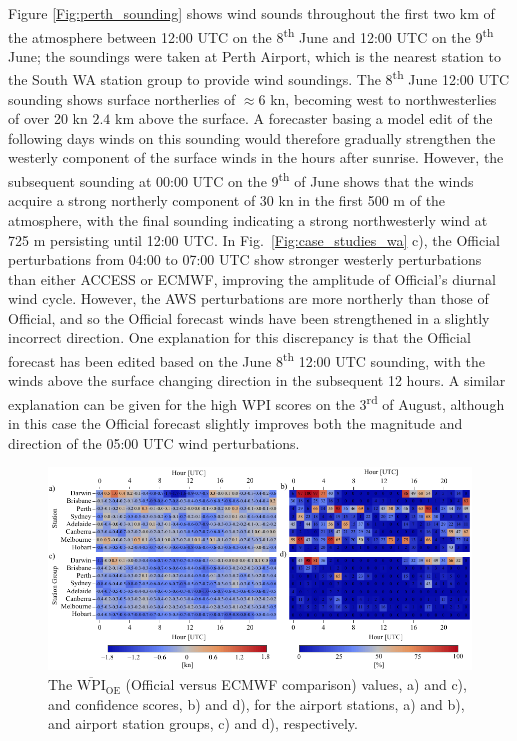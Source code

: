 \documentclass{ametsoc}
\begin{document}
Figure \ref{Fig:perth_sounding} shows wind sounds throughout the first two km of the atmosphere between 12:00 UTC on the 8\textsuperscript{th} June and 12:00 UTC on the 9\textsuperscript{th} June; the soundings were taken at Perth Airport, which is the nearest station to the South WA station group to provide wind soundings. The 8\textsuperscript{th} June 12:00 UTC sounding shows surface northerlies of $\approx 6$ kn, becoming west to northwesterlies of over 20 kn $2.4$ km above the surface. A forecaster basing a model edit of the following days winds on this sounding would therefore gradually strengthen the westerly component of the surface winds in the hours after sunrise. However, the subsequent sounding at 00:00 UTC on the 9\textsuperscript{th} of June shows that the winds acquire a strong northerly component of 30 kn in the first 500 m of the atmosphere, with the final sounding indicating a strong northwesterly wind at 725 m persisting until 12:00 UTC. In Fig.~\ref{Fig:case_studies_wa} c), the Official perturbations from 04:00 to 07:00 UTC show stronger westerly perturbations than either ACCESS or ECMWF, improving the amplitude of Official's diurnal wind cycle. However, the AWS perturbations are more northerly than those of Official, and so the Official forecast winds have been strengthened in a slightly incorrect direction. One explanation for this discrepancy is that the Official forecast has been edited based on the June 8\textsuperscript{th} 12:00 UTC sounding, with the winds above the surface changing direction in the subsequent 12 hours. A similar explanation can be given for the high WPI scores on the  3\textsuperscript{rd} of August, although in this case the Official forecast slightly improves both the magnitude and direction of the 05:00 UTC wind perturbations.

\begin{figure}
\centering
\includegraphics[width=39pc]{airport_wpi.pdf}
\caption{The $\overline{\text{WPI}}_\text{OE}$ (Official versus ECMWF comparison) values, a) and c), and confidence scores, b) and d), for the airport stations, a) and b), and airport station groups, c) and d), respectively.}
\label{Fig:airport_wpi}
\end{figure}
\end{document}
